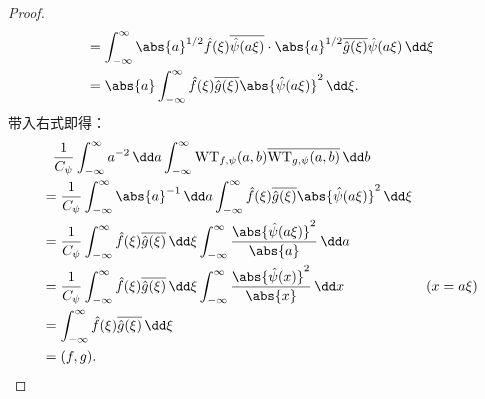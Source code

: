 \begin{proof}
\begin{align}
        &=\int_{-\infty}^{\infty}\abs{a}^{1/2}\hat{f}(\xi)\overline{\hat{\psi}(a\xi)}\cdot\abs{a}^{1/2}\overline{\hat{g}(\xi)}\hat{\psi}(a\xi)\,\dd\xi\nonumber\\
        &=\abs{a}\int_{-\infty}^{\infty}\hat{f}(\xi)\overline{\hat{g}(\xi)}\abs{\hat{\psi}(a\xi)}^2\,\dd\xi.
    \end{align}
    带入右式即得：
    \begin{align}
        &\phantom{=}\frac{1}{C_{\psi}}\int_{-\infty}^{\infty}a^{-2}\,\dd a\int_{-\infty}^{\infty}\mathrm{WT}_{f,\psi}(a,b)\overline{\mathrm{WT}_{g,\psi}(a,b)}\,\dd b\nonumber\\
        &=\frac{1}{C_{\psi}}\int_{-\infty}^{\infty}\abs{a}^{-1}\,\dd a\int_{-\infty}^{\infty}\hat{f}(\xi)\overline{\hat{g}(\xi)}\abs{\hat{\psi}(a\xi)}^2\,\dd\xi\nonumber\\
        &=\frac{1}{C_{\psi}}\int_{-\infty}^{\infty}\hat{f}(\xi)\overline{\hat{g}(\xi)}\,\dd\xi\int_{-\infty}^{\infty}\frac{\abs{\hat{\psi}(a\xi)}^2}{\abs{a}}\,\dd a\nonumber\\
        &=\frac{1}{C_{\psi}}\int_{-\infty}^{\infty}\hat{f}(\xi)\overline{\hat{g}(\xi)}\,\dd\xi\int_{-\infty}^{\infty}\frac{\abs{\hat{\psi}(x)}^2}{\abs{x}}\,\dd x&(x=a\xi)\nonumber\\
        &=\int_{-\infty}^{\infty}\hat{f}(\xi)\overline{\hat{g}(\xi)}\,\dd\xi\nonumber\\
        &=(f,g).
    \end{align}
\end{proof}

